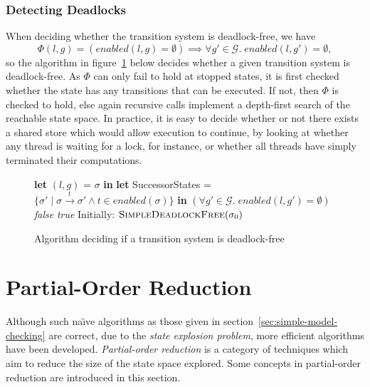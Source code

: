 \documentclass[12pt,a4paper,twoside,openright]{report}
\newcommand{\Let}[2]{\State \textbf{let} #1 = #2 \textbf{in}}
\begin{document}
\subsubsection{Detecting Deadlocks}
When deciding whether the transition system
is deadlock-free, we have
\[
	\Phi(l, g) = (\textit{enabled}(l, g) = \emptyset)
	\implies \forall g' \in \mathcal{G}. \;
	\textit{enabled}(l, g') = \emptyset,
\]
so the algorithm in figure~\ref{fig:simple-deadlock-free}
below decides whether a given transition system
is deadlock-free. As $\Phi$ can only fail to hold
at stopped states, it is first
checked whether the state has any
transitions that can be executed. If not, then
$\Phi$ is checked to hold, else again recursive calls implement a
depth-first search of the reachable state space.
In practice, it is easy to decide whether or not
there exists a shared store which would allow
execution to continue, by looking at whether
any thread is waiting for a lock, for instance,
or whether all threads have simply terminated
their computations.

\begin{figure}
	\begin{algorithmic}[1]
		\Let{$(l, g)$}{$\sigma$}
		\Let{SuccessorStates}{$\{\sigma' \mid \sigma \xrightarrow{t}
			\sigma' \wedge t \in \textit{enabled}(\sigma)\}$}
		\State\Return $(\forall g' \in \mathcal{G}.\; \textit{enabled}(l, g')
				= \emptyset)$
			\Else
					\Return \textit{false}
				\EndIf
			\EndFor
		\State \Return \textit{true}
		\EndIf
		\EndProcedure
		\State
		\State Initially: $\textsc{SimpleDeadlockFree}(\sigma_0)$
	\end{algorithmic}
	\caption{Algorithm deciding if a transition system is deadlock-free}
	\label{fig:simple-deadlock-free}
\end{figure}

\section{Partial-Order Reduction}
Although such na\"{\i}ve algorithms as those given
in section~\ref{sec:simple-model-checking}
are correct, due to the \emph{state explosion problem},
more efficient algorithms have been developed.
\emph{Partial-order reduction} is a category of
techniques which aim to reduce the size of the
state space explored. Some concepts in
partial-order reduction are introduced in
this section.
\end{document}
